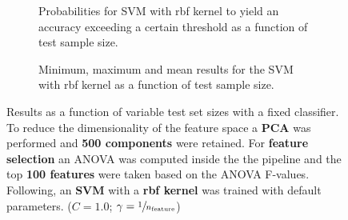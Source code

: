 \begin{figure}
    \captionsetup[subfigure]{justification=justified,singlelinecheck=false}
    \begin{subfigure}[t]{0.61\textwidth}
        
        \caption{Probabilities for SVM with rbf kernel to yield an accuracy exceeding a certain threshold as a function of test sample size.}
    \end{subfigure}
    \hspace{3.0mm}
    \begin{subfigure}[t]{0.34\textwidth}
        
        \caption{Minimum, maximum and mean results for the SVM with rbf kernel as a function of test sample size.}
    \end{subfigure}
    \caption[Effects of varying test sample size. SVM (kernel = rbf); Preprocessing: PCA ($n_\text{components} = \num{500}$); ANOVA feature selection ($k_\text{best} = \num{100}$)]{Results as a function of variable test set sizes with a fixed classifier. To reduce the dimensionality of the feature space a \textbf{PCA} was performed and \textbf{\num{500} components} were retained. For \textbf{feature selection} an ANOVA was computed inside the the pipeline and the top \textbf{\num{100} features} were taken based on the ANOVA F-values. Following, an \textbf{{SVM}} with a \textbf{{rbf kernel}} was trained with default parameters. ($C=\num{1.0}$; $\gamma=\sfrac{1}{n_\text{feature}}$)}
    \label{fig:PCA_500_components_100_best_selected_SVC}
\end{figure}

